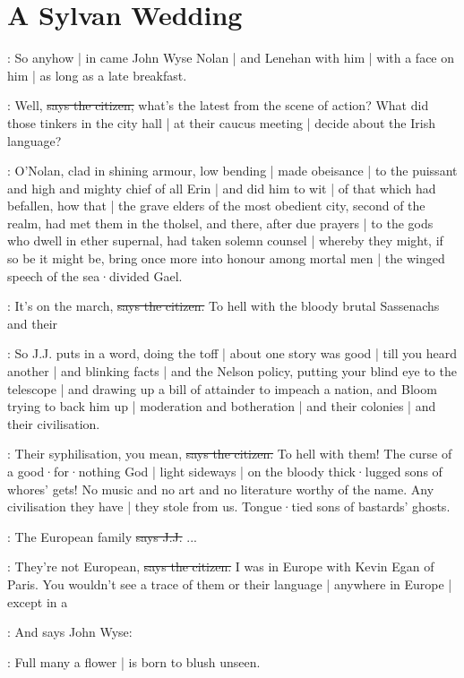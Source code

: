 \section{A Sylvan Wedding}

\Nq:
So anyhow |
in came John Wyse Nolan |
and Lenehan with him |
with a face on him |
as long as a late breakfast.

\citizen:
Well,
\sout{says the citizen,}
what's the latest from the scene of action?
What did those tinkers in the city hall |
at their caucus meeting |
decide about the Irish language?

:
O'Nolan,
clad in shining armour,
low bending |
made obeisance |
to the puissant and high and mighty chief of all Erin |
and did him to wit |
of that which had befallen,
how that |
the grave elders of the most obedient city,
second of the realm,
had met them in the tholsel,
and there,
after due prayers |
to the gods who dwell in ether supernal,
had taken solemn counsel |
whereby they might,
if so be it might be,
bring once more into honour among mortal men |
the winged speech of the sea·divided Gael.

\citizen:
It's on the march,
\sout{says the citizen.}
To hell with the bloody brutal Sassenachs and their 

\Nq:
So J.J. puts in a word,
doing the toff |
about one story was good |
till you heard another |
and blinking facts |
and the Nelson policy,
putting your blind eye to the telescope |
and drawing up a bill of attainder to impeach a nation,
and Bloom trying to back him up |
moderation and botheration |
and their colonies |
and their civilisation.

\citizen:
Their syphilisation,
you mean,
\sout{says the citizen.}
To hell with them!
The curse of a good·for·nothing God |
light sideways |
on the bloody thick·lugged sons of whores' gets!
No music and no art and no literature worthy of the name.
Any civilisation they have |
they stole from us.
Tongue·tied sons of bastards' ghosts.

\jjom:
The European family
\sout{says J.J.}
...

\citizen:
They're not European,
\sout{says the citizen.}
I was in Europe with Kevin Egan of Paris.
You wouldn't see a trace of them or their language |
anywhere in Europe |
except in a 

\Nq:
And says John Wyse:

\johnwyse:
Full many a flower |
is born to blush unseen.

